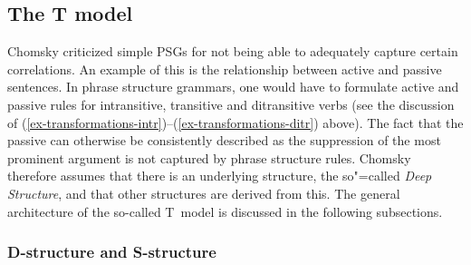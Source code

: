 \subsection{The T model}
\label{Abschnitt-T-Modell}

Chomsky
criticized simple PSGs for not being able to adequately capture certain correlations. An example of this is the relationship between
active and passive sentences. In phrase structure grammars, one would have to formulate active and passive rules for intransitive,
transitive and ditransitive verbs (see the discussion of
(\ref{ex-transformations-intr})--(\ref{ex-transformations-ditr}) above). The fact that the passive
can otherwise be consistently described as the suppression of the most prominent argument is not
captured by phrase structure rules. Chomsky therefore assumes that there is an underlying structure,
the so"=called \emph{Deep Structure}, and that
other structures are derived from this.  The general architecture of the so-called T~model is discussed in the following subsections.

\subsubsection{D-structure and S-structure}

